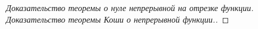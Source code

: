 
\label{sec_Proofs01}
\begin{proof}[Доказательство теоремы о нуле непрерывной на отрезке функции. Доказательство теоремы Коши о непрерывной функции.]
    
\end{proof}